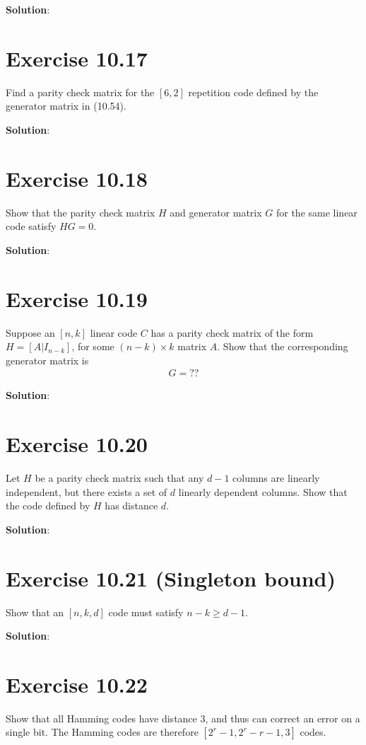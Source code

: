 \documentclass{book}
\begin{document}
    \textbf{Solution}:

\section*{Exercise 10.17}
    Find a parity check matrix for the $[6,2]$ repetition code defined by the generator matrix in (10.54). 

    \textbf{Solution}:

\section*{Exercise 10.18}
    Show that the parity check matrix $H$ and generator matrix $G$ for the same linear code satisfy $HG = 0$. 

    \textbf{Solution}:

\section*{Exercise 10.19}
    Suppose an $[n,k]$ linear code $C$ has a parity check matrix of the form $H = [A\vert I_{n-k}]$, for some $(n-k)\times k$ matrix $A$. Show that the corresponding generator matrix is
    \begin{align}
        G = ??
    \end{align}

    \textbf{Solution}:

\section*{Exercise 10.20}
    Let $H$ be a parity check matrix such that any $d - 1$ columns are linearly independent, but there exists a set of $d$ linearly dependent columns. Show that the code defined by $H$ has distance $d$. 

    \textbf{Solution}:

\section*{Exercise 10.21 (Singleton bound)}
    Show that an $[n, k, d]$ code must satisfy $n-k \geq d-1$. 

    \textbf{Solution}:

\section*{Exercise 10.22}
    Show that all Hamming codes have distance 3, and thus can correct an error on a single bit. The Hamming codes are therefore $[2^r - 1, 2^r - r - 1, 3]$ codes. 
    
\end{document}
